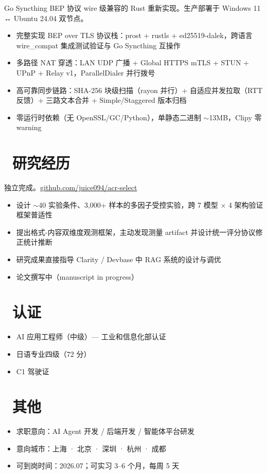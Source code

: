 \documentclass{resume}
\begin{document}
Go Syncthing BEP 协议 wire 级兼容的 Rust 重新实现。生产部署于 Windows 11 ↔ Ubuntu 24.04 双节点。
\begin{itemize}
  \item 完整实现 BEP over TLS 协议栈：prost + rustls + ed25519-dalek，跨语言 wire\_compat 集成测试验证与 Go Syncthing 互操作
  \item 多路径 NAT 穿透：LAN UDP 广播 + Global HTTPS mTLS + STUN + UPnP + Relay v1，ParallelDialer 并行拨号
  \item 高可靠同步链路：SHA-256 块级扫描（rayon 并行）+ 自适应并发拉取（RTT 反馈）+ 三路文本合并 + Simple/Staggered 版本归档
  \item 零运行时依赖（无 OpenSSL/GC/Python），单静态二进制 $\sim$13MB，Clipy 零 warning
\end{itemize}

\section{\faFlask\ 研究经历}
独立完成。\href{https://github.com/juice094/acr-select}{github.com/juice094/acr-select}
\begin{itemize}
  \item 设计 $\sim$40 实验条件、3,000+ 样本的多因子受控实验，跨 7 模型 × 4 架构验证框架普适性
  \item 提出格式-内容双维度观测框架，主动发现测量 artifact 并设计统一评分协议修正统计推断
  \item 研究成果直接指导 Clarity / Devbase 中 RAG 系统的设计与调优
  \item 论文撰写中（manuscript in progress）
\end{itemize}

\section{\faCertificate\ 认证}
\begin{itemize}[parsep=0.5ex]
  \item AI 应用工程师（中级）--- 工业和信息化部认证
  \item 日语专业四级（72 分）
  \item C1 驾驶证
\end{itemize}

\section{\faInfo\ 其他}
\begin{itemize}[parsep=0.5ex]
  \item 求职意向：AI Agent 开发 / 后端开发 / 智能体平台研发
  \item 意向城市：上海 · 北京 · 深圳 · 杭州 · 成都
  \item 可到岗时间：2026.07；可实习 3--6 个月，每周 5 天
\end{itemize}
\end{document}
